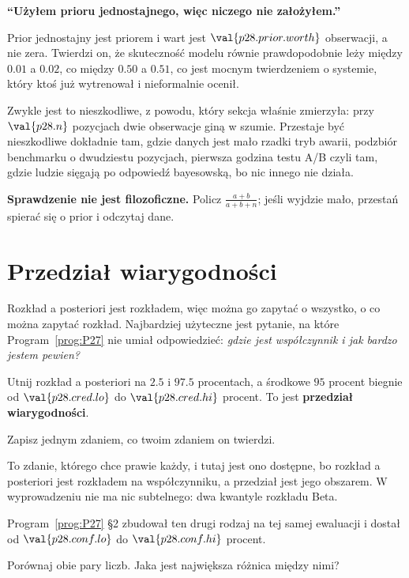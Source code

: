 \begin{fr}
\begin{trapbox}
\textbf{\enquote{Użyłem prioru jednostajnego, więc niczego nie założyłem.}}

Prior jednostajny jest priorem i wart jest $\val{p28.prior.worth}$
obserwacji, a nie zera. Twierdzi on, że skuteczność modelu równie
prawdopodobnie leży między $\num{0.01}$ a $\num{0.02}$, co między
$\num{0.50}$ a $\num{0.51}$, co jest mocnym twierdzeniem o systemie, który
ktoś już wytrenował i nieformalnie ocenił.

Zwykle jest to nieszkodliwe, z powodu, który sekcja właśnie zmierzyła: przy
$\val{p28.n}$ pozycjach dwie obserwacje giną w szumie. Przestaje być
nieszkodliwe dokładnie tam, gdzie danych jest mało \dash{} rzadki tryb awarii,
podzbiór benchmarku o dwudziestu pozycjach, pierwsza godzina testu A/B
\dash{} czyli tam, gdzie ludzie sięgają po odpowiedź bayesowską, bo nic innego
nie działa.

\textbf{Sprawdzenie nie jest filozoficzne.} Policz $\frac{a+b}{a+b+n}$; jeśli
wyjdzie mało, przestań spierać się o prior i odczytaj dane.
\end{trapbox}
\end{fr}

\section{Przedział wiarygodności}
\label{sec:P28-credible}

\begin{fr}
Rozkład a posteriori jest rozkładem, więc można go zapytać o wszystko, o co
można zapytać rozkład. Najbardziej użyteczne jest pytanie, na które
Program~\ref{prog:P27} nie umiał odpowiedzieć: \emph{gdzie jest współczynnik i
jak bardzo jestem pewien?}

Utnij rozkład a posteriori na $\num{2.5}$ i $\num{97.5}$ procentach, a środkowe
$95$ procent biegnie od $\val{p28.cred.lo}$ do $\val{p28.cred.hi}$ procent. To
jest \textbf{przedział wiarygodności}.

Zapisz jednym zdaniem, co twoim zdaniem on twierdzi.
\dotline
\nextframe
\end{fr}

\begin{fr}

To zdanie, którego chce prawie każdy, i tutaj jest ono dostępne, bo rozkład
a posteriori jest rozkładem na współczynniku, a przedział jest jego obszarem.
W wyprowadzeniu nie ma nic subtelnego: dwa kwantyle rozkładu Beta.

Program~\ref{prog:P27} §2 zbudował ten drugi rodzaj na tej samej ewaluacji i
dostał od $\val{p28.conf.lo}$ do $\val{p28.conf.hi}$ procent.

Porównaj obie pary liczb. Jaka jest największa różnica między nimi?
\dotline
\nextframe
\end{fr}

